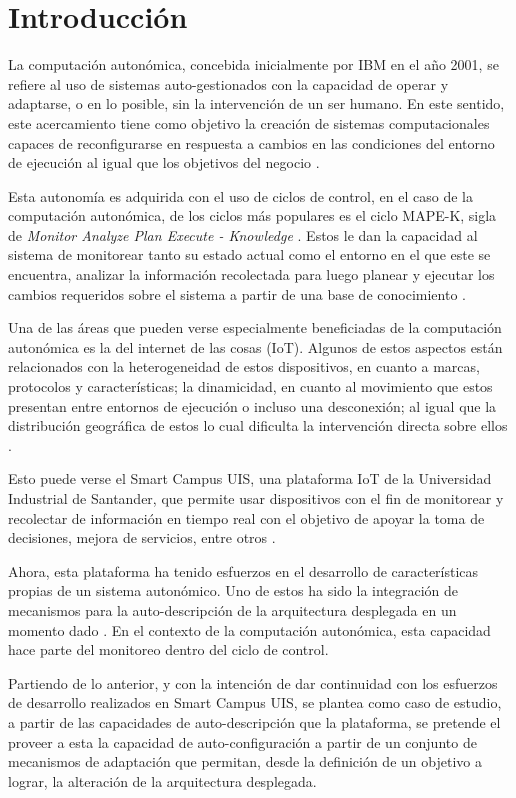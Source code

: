 \section*{Introducción}


La computación autonómica, concebida inicialmente por IBM en el año 2001, se refiere al uso de sistemas auto-gestionados con la capacidad de operar y adaptarse, o en lo posible, sin la intervención de un ser humano. En este sentido, este acercamiento tiene como objetivo la creación de sistemas computacionales capaces de reconfigurarse en respuesta a cambios en las condiciones del entorno de ejecución al igual que los objetivos del negocio \cite{horn_2001}.

Esta autonomía es adquirida con el uso de ciclos de control, en el caso de la computación autonómica, de los ciclos más populares es el ciclo MAPE-K, sigla de \textit{Monitor Analyze Plan Execute - Knowledge} \cite{Arcaini_2015}. Estos le dan la capacidad al sistema de monitorear tanto su estado actual como el entorno en el que este se encuentra, analizar la información recolectada para luego planear y ejecutar los cambios requeridos sobre el sistema a partir de una base de conocimiento \cite{RutanenKalle2018McoO}.

Una de las áreas que pueden verse especialmente beneficiadas de la computación autonómica es la del internet de las cosas (IoT). Algunos de estos aspectos están relacionados con la heterogeneidad de estos dispositivos, en cuanto a marcas, protocolos y características; la dinamicidad, en cuanto al movimiento que estos presentan entre entornos de ejecución o incluso una desconexión; al igual que la distribución geográfica de estos lo cual dificulta la intervención directa sobre ellos \cite{Tahir_2019}. 

Esto puede verse el Smart Campus UIS, una plataforma IoT de la Universidad Industrial de Santander, que permite usar dispositivos con el fin de monitorear y recolectar de información en tiempo real con el objetivo de apoyar la toma de decisiones, mejora de servicios, entre otros \cite{henry_2020}.

Ahora, esta plataforma ha tenido esfuerzos en el desarrollo de características propias de un sistema autonómico. Uno de estos ha sido la integración de mecanismos para la auto-descripción de la arquitectura desplegada en un momento dado \cite{msc_henry_2022}. En el contexto de la computación autonómica, esta capacidad hace parte del monitoreo dentro del ciclo de control. 

Partiendo de lo anterior, y con la intención de dar continuidad con los esfuerzos de desarrollo realizados en Smart Campus UIS, se plantea como caso de estudio, a partir de las capacidades de auto-descripción que la plataforma, se pretende el proveer a esta la capacidad de auto-configuración a partir de un conjunto de mecanismos de adaptación que permitan, desde la definición de un objetivo a lograr, la alteración de la arquitectura desplegada. 